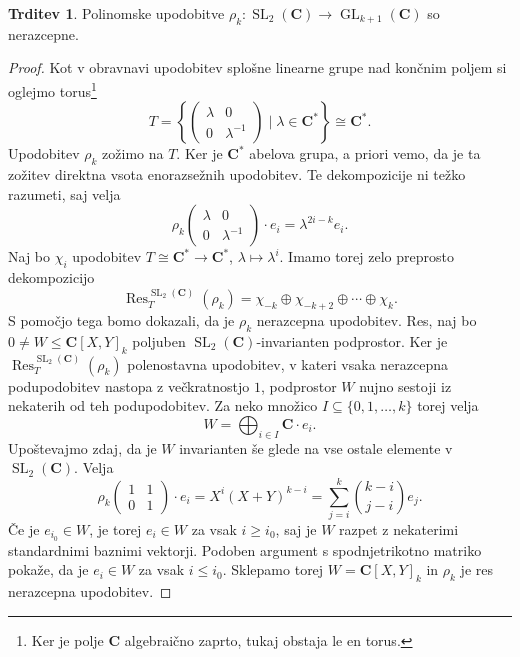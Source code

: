 \documentclass[11pt]{book}
\def\CC{\mathbf{C}}
\DeclareMathOperator\Res{Res}
\DeclareMathOperator\GL{GL}
\DeclareMathOperator\SL{SL}
\theoremstyle{definition}
\theoremstyle{zgled}
\theoremstyle{odprtproblem}
\theoremstyle{domacanaloga}
\newenvironment{dokaz}
    {\color{siva}\begin{proof}}
    {\end{proof}}
\theoremstyle{izrek}
\newtheorem*{trditev}{Trditev}
\begin{document}
\begin{trditev}
Polinomske upodobitve $\rho_k \colon \SL_2(\CC) \to \GL_{k+1}(\CC)$ so nerazcepne.
\end{trditev}
\begin{dokaz}
Kot v obravnavi upodobitev splošne linearne grupe nad končnim poljem si oglejmo torus\footnote{Ker je polje $\CC$ algebraično zaprto, tukaj obstaja le en torus.}
\[
    T = \left\{ 
        \begin{pmatrix}
            \lambda & 0 \\ 0 & \lambda^{-1}
        \end{pmatrix}        
        \mid
        \lambda \in \CC^*
    \right\} \cong \CC^*.
\]
Upodobitev $\rho_k$ zožimo na $T$. Ker je $\CC^*$ abelova grupa, a priori vemo, da je ta zožitev direktna vsota enorazsežnih upodobitev. Te dekompozicije ni težko razumeti, saj velja
\[
    \rho_k \begin{pmatrix}
        \lambda & 0 \\ 0 & \lambda^{-1}
    \end{pmatrix}
    \cdot e_i
    = \lambda^{2i - k} e_i.
\]
Naj bo $\chi_i$ upodobitev $T \cong \CC^* \to \CC^*$, $\lambda \mapsto \lambda^i$. Imamo torej zelo preprosto dekompozicijo
\[
    {\textstyle \Res^{\SL_2(\CC)}_T(\rho_k)}
    = 
    \chi_{-k} \oplus \chi_{-k+2} \oplus \cdots \oplus \chi_{k}.
\]
S pomočjo tega bomo dokazali, da je $\rho_k$ nerazcepna upodobitev. Res, naj bo $0 \neq W \leq \CC[X,Y]_k$ poljuben $\SL_2(\CC)$-invarianten podprostor. Ker je $\Res^{\SL_2(\CC)}_T(\rho_k)$ polenostavna upodobitev, v kateri vsaka nerazcepna podupodobitev nastopa z večkratnostjo $1$, podprostor $W$ nujno sestoji iz nekaterih od teh podupodobitev. Za neko množico $I \subseteq \{ 0,1,\dots,k\}$ torej velja
\[
    W = \bigoplus_{i \in I} \CC \cdot e_i.
\]
Upoštevajmo zdaj, da je $W$ invarianten še glede na vse ostale elemente v $\SL_2(\CC)$. Velja
\[
    \rho_k \begin{pmatrix}
        1 & 1 \\ 0 & 1
    \end{pmatrix}
    \cdot e_i
    = X^i (X+Y)^{k-i}
    = \sum_{j = i}^k \binom{k-i}{j-i} e_j.
\]
Če je $e_{i_0} \in W$, je torej $e_i \in W$ za vsak $i \geq i_0$, saj je $W$ razpet z nekaterimi standardnimi baznimi vektorji. Podoben argument s spodnjetrikotno matriko pokaže, da je $e_i \in W$ za vsak $i \leq i_0$. Sklepamo torej $W = \CC[X,Y]_k$ in $\rho_k$ je res nerazcepna upodobitev.
\end{dokaz}
\end{document}
